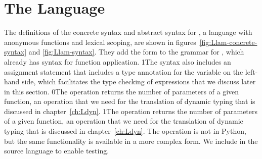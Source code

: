 \documentclass[7x10]{TimesAPriori_MIT}%
\def\racketEd{0}
\def\pythonEd{1}
\def\edition{1}
\newcommand{\racket}[1]{{\if\edition\racketEd{#1}\fi}}
\newcommand{\pythonColor}[0]{}
\newcommand{\python}[1]{{\if\edition\pythonEd\pythonColor #1\fi}}
\numberwithin{theorem}{chapter}
\numberwithin{definition}{chapter}
\numberwithin{equation}{chapter}
\begin{document}
\section{The \LangLam{} Language}
\label{sec:r5}

The definitions of the concrete syntax and abstract syntax for
\LangLam{}, a language with anonymous functions and lexical scoping,
are shown in figures~\ref{fig:Llam-concrete-syntax} and
\ref{fig:Llam-syntax}. They add the  form to the grammar
for \LangFun{}, which already has syntax for function application.
%
\python{The syntax also includes an assignment statement that includes
  a type annotation for the variable on the left-hand side, which
  facilitates the type checking of \code{lambda} expressions that we
  discuss later in this section.}
%
\racket{The  operation returns the number of parameters
  of a given function, an operation that we need for the translation
  of dynamic typing that is discussed in chapter~\ref{ch:Ldyn}.}
%
\python{The  operation returns the number of parameters of
  a given function, an operation that we need for the translation
  of dynamic typing that is discussed in chapter~\ref{ch:Ldyn}.
  The \code{arity} operation is not in Python, but the same functionality
  is available in a more complex form. We include \code{arity} in the
  \LangLam{} source language to enable testing.}

\newcommand{\LlambdaGrammarRacket}{
  \begin{array}{lcl}
  \Exp &::=&  \CLAMBDA{\LP\LS\Var \key{:} \Type\RS\ldots\RP}{\Type}{\Exp} \\
    &\MID& \LP \key{procedure-arity}~\Exp\RP
  \end{array}
}
\newcommand{\LlambdaASTRacket}{
  \begin{array}{lcl}
  \Exp &::=& \LAMBDA{\LP\LS\Var\code{:}\Type\RS\ldots\RP}{\Type}{\Exp}\\
  \itm{op} &::=& \code{procedure-arity} 
  \end{array}
}

\newcommand{\LlambdaGrammarPython}{
  \begin{array}{lcl}
  \Exp &::=& \CLAMBDA{\Var\code{, }\ldots}{\Exp} \MID \CARITY{\Exp} \\
  \Stmt &::=& \CANNASSIGN{\Var}{\Type}{\Exp}
  \end{array}
}

\newcommand{\LlambdaASTPython}{
  \begin{array}{lcl}
  \Exp &::=& \LAMBDA{\Var^{*}}{\Exp} \MID \ARITY{\Exp} \\
  \Stmt &::=& \ANNASSIGN{\Var}{\Type}{\Exp}
  \end{array}
}
\end{document}
